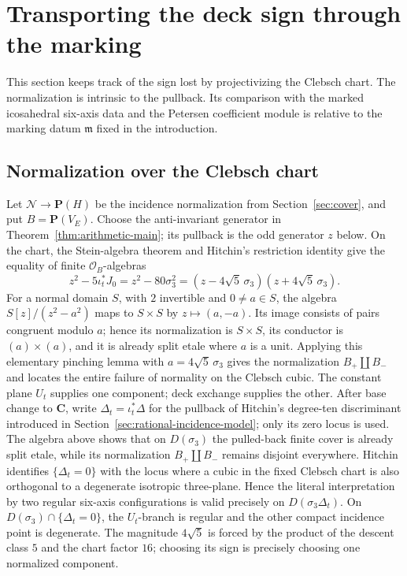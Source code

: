 \section{Transporting the deck sign through the marking}
\label{sec:marked-sheet-transport}

This section keeps track of the sign lost by projectivizing the Clebsch
chart.  The normalization is intrinsic to the pullback.  Its comparison with
the marked icosahedral six-axis data and the Petersen coefficient module is relative to
the marking datum \(\mathfrak m\) fixed in the introduction.

\subsection{Normalization over the Clebsch chart}

Let \(\mathcal N\to\mathbf P(H)\) be the incidence normalization from
Section~\ref{sec:cover}, and put \(B=\mathbf P(V_E)\).  Choose the
anti-invariant generator in Theorem~\ref{thm:arithmetic-main}; its pullback
is the odd generator \(z\) below.  On the chart, the Stein-algebra theorem
and Hitchin's restriction identity give the equality of finite
\(\mathcal O_B\)-algebras
\[
 z^2-5\iota_t^*J_0=z^2-80\sigma_3^2
   =(z-4\sqrt5\,\sigma_3)(z+4\sqrt5\,\sigma_3).
\]
For a normal domain \(S\), with \(2\) invertible and \(0\ne a\in S\), the algebra
\(S[z]/(z^2-a^2)\) maps to \(S\times S\) by \(z\mapsto(a,-a)\).  Its image
consists of pairs congruent modulo \(a\); hence its normalization is
\(S\times S\), its conductor is \((a)\times(a)\), and it is already split
etale where \(a\) is a unit.  Applying this elementary pinching lemma with
\(a=4\sqrt5\,\sigma_3\) gives the normalization
\(B_+\amalg B_-\) and locates the entire failure of normality on the
Clebsch cubic.  The constant plane \(U_t\) supplies one component; deck
exchange supplies the other.  After base change to \(\mathbf C\), write
\(\Delta_t=\iota_t^*\Delta\) for the pullback of Hitchin's degree-ten
discriminant introduced in Section~\ref{sec:rational-incidence-model}; only
its zero locus is used.  The algebra above shows that on \(D(\sigma_3)\) the
pulled-back finite cover is already split etale, while its normalization
\(B_+\amalg B_-\) remains disjoint everywhere.  Hitchin
\cite[\S8.2]{HitchinBundles} identifies \(\{\Delta_t=0\}\) with the locus
where a cubic in the fixed Clebsch chart is also orthogonal to a degenerate
isotropic three-plane.  Hence the literal interpretation by two regular
six-axis configurations is valid precisely on \(D(\sigma_3\Delta_t)\).  On
\(D(\sigma_3)\cap\{\Delta_t=0\}\), the \(U_t\)-branch is regular and the
other compact incidence point is degenerate.
The magnitude \(4\sqrt5\) is forced by the product of the descent class
\(5\) and the chart factor \(16\); choosing its sign is precisely choosing
one normalized component.

